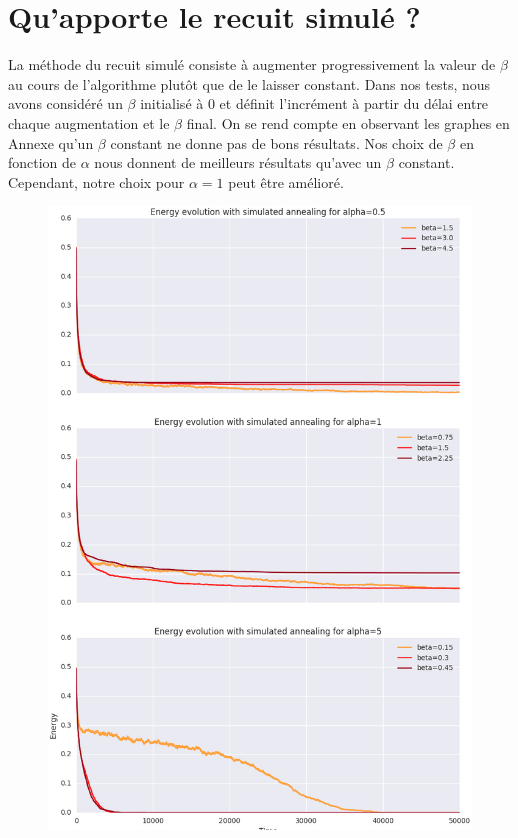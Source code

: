 \documentclass[twocolumn]{article}
\begin{document}
	\section{Qu'apporte le recuit simulé ?}
		La méthode du recuit simulé consiste à augmenter progressivement la valeur de $\beta$ au cours de l'algorithme plutôt que de le laisser constant. Dans nos tests, nous avons considéré un $\beta$ initialisé à 0 et définit l'incrément à partir du délai entre chaque augmentation et le $\beta$ final.
		On se rend compte en observant les graphes en Annexe qu'un $\beta$ constant ne donne pas de bons résultats.  Nos choix de $\beta$ en fonction de $\alpha$ nous donnent de meilleurs résultats qu'avec un $\beta$ constant. Cependant, notre choix pour $\alpha = 1$ peut être amélioré.
		
		\begin{figure}
		\includegraphics[width=\columnwidth]{../tobekept/ex1_sim_1683536997971113732-r.png}
		\end{figure}
		
\end{document}

